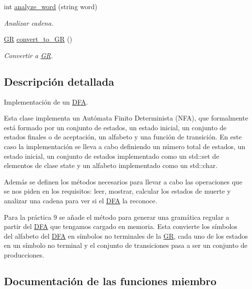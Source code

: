 \begin{DoxyCompactItemize}
int \mbox{\hyperlink{class_d_f_a_a227c0b51b2f512efe3dad555438dcb87}{analyze\+\_\+word}} (string word)
\begin{DoxyCompactList}\small\item\em Analizar cadena. \end{DoxyCompactList}\item 
\mbox{\hyperlink{class_g_r}{GR}} \mbox{\hyperlink{class_d_f_a_a1e6d75070c094116a6d54f9ed61770e4}{convert\+\_\+to\+\_\+\+GR}} ()
\begin{DoxyCompactList}\small\item\em Convertir a \mbox{\hyperlink{class_g_r}{GR}}. \end{DoxyCompactList}\end{DoxyCompactItemize}


\subsection{Descripción detallada}
Implementación de un \mbox{\hyperlink{class_d_f_a}{D\+FA}}. 

Esta clase implementa un Autómata Finito Determinista (N\+FA), que formalmente está formado por un conjunto de estados, un estado inicial, un conjunto de estados finales o de aceptación, un alfabeto y una función de transición. En este caso la implementación se lleva a cabo definiendo un número total de estados, un estado inicial, un conjunto de estados implementado como un std\+::set de elementos de clase state y un alfabeto implementado como un std\+::char.

Además se definen los métodos necesarios para llevar a cabo las operaciones que se nos piden en los requisitos\+: leer, mostrar, calcular los estados de muerte y analizar una cadena para ver si el \mbox{\hyperlink{class_d_f_a}{D\+FA}} la reconoce.

Para la práctica 9 se añade el método para generar una gramática regular a partir del \mbox{\hyperlink{class_d_f_a}{D\+FA}} que tengamos cargado en memoria. Esta convierte los símbolos del alfabeto del \mbox{\hyperlink{class_d_f_a}{D\+FA}} en símbolos no terminales de la \mbox{\hyperlink{class_g_r}{GR}}, cada uno de los estados en un símbolo no terminal y el conjunto de transiciones pasa a ser un conjunto de producciones. 

\subsection{Documentación de las funciones miembro}
\mbox{\label{class_d_f_a_a227c0b51b2f512efe3dad555438dcb87}} 

